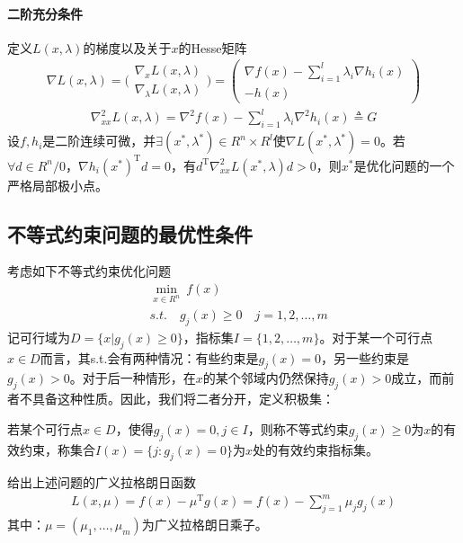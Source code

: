         \paragraph{二阶充分条件}
        定义$L(x,\lambda)$的梯度以及关于$x$的Hesse矩阵
        \begin{align*}
        \nabla L(x,\lambda)=\bigg(\begin{aligned}{\nabla}_x L(x,\lambda)\\
        {\nabla}_{\lambda} L(x,\lambda)
        \end{aligned}\bigg)
        =
        \begin{pmatrix}
        \nabla f(x)-\mathop {\sum}\limits_{i=1}^l{\lambda}_i \nabla h_i(x)\\
        -h(x)
        \end{pmatrix}
        \end{align*}
        \begin{align*}
        {\nabla}_{xx}^2L(x,\lambda)={\nabla}^2f(x)-\mathop {\sum}\limits_{i=1}^l{\lambda}_i {\nabla}^2 h_i(x)\triangleq G
        \end{align*}
        设$f,h_i$是二阶连续可微，并$\exists(x^*,{\lambda}^*) \in R^n\times R^l$使$\nabla L(x^*,{\lambda}^*)=0$。若$\forall d \in R^n/0$，$\nabla h_i(x^*)^\mathrm{T} d=0$，有$d^\mathrm{T} {\nabla}_{xx}^2L(x^*,\lambda)d>0$，则$x^*$是优化问题的一个严格局部极小点。
    \subsection{不等式约束问题的最优性条件}
        \par
        考虑如下不等式约束优化问题
        \begin{align*}
        & \min_{x\in R^n}\ f(x)\\
        & s.t.\quad g_j(x) \geqslant 0\quad j=1,2,\ldots,m
        \end{align*}
        记可行域为$D=\{x|g_j(x) \geqslant 0\}$，指标集$I=\{1,2,\ldots,m\}$。对于某一个可行点$x \in D$而言，其s.t.会有两种情况：有些约束是$g_j(x)=0$，另一些约束是$g_j(x)>0$。对于后一种情形，在$x$的某个邻域内仍然保持$g_j(x)>0$成立，而前者不具备这种性质。因此，我们将二者分开，定义积极集：
        \begin{definition}[积极集]
        若某个可行点$x \in D$，使得$g_j(x)=0,j\in I$，则称不等式约束$g_j(x) \geqslant 0$为$x$的有效约束，称集合$I(x)=\{j:g_j(x)=0\}$为$x$处的有效约束指标集。
        \end{definition}
        \par
        给出上述问题的广义拉格朗日函数
        \begin{align*}
        L(x,\mu)=f(x)-{\mu}^\mathrm{T} g(x)=f(x)-\mathop {\sum}\limits_{j=1}^m \mu_j g_j(x)
        \end{align*}
        其中：$\mu= (\mu_1,\dots,\mu_m)$为广义拉格朗日乘子。
